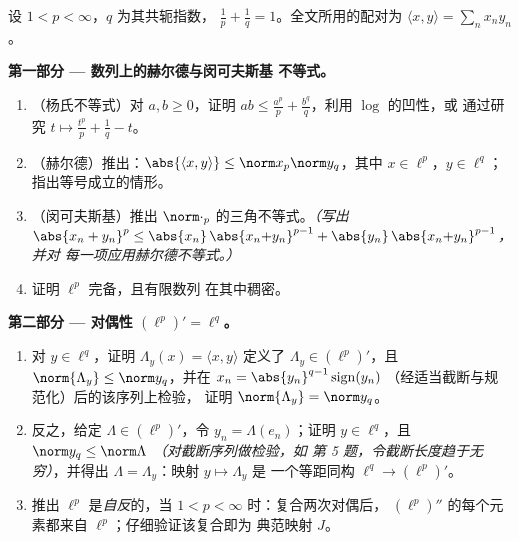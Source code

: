 \begin{problem}[{周末问题 --- $(\ell^p)' = \ell^q$，
自反性，以及 $\ell^\infty$ 的奇异性}]
\label{pb:b3:banach:1}
设 $1 < p < \infty$，$q$ 为其共轭指数，
$\frac1p + \frac1q = 1$。全文所用的配对为 $\langle x,
y\rangle = \sum_n x_ny_n$。

\medskip
\noindent\textbf{第一部分 --- 数列上的赫尔德与闵可夫斯基
不等式。}
\begin{enumerate}
  \item （杨氏不等式）对 $a, b \geq 0$，证明 $ab \leq
        \frac{a^p}p + \frac{b^q}q$，利用 $\log$ 的凹性，或
        通过研究 $t \mapsto \frac{t^p}p + \frac1q - t$。
  \item （赫尔德）推出：$\abs{\langle x, y\rangle} \leq
        \norm x_p\norm y_q$，其中 $x \in \ell^p$，$y \in \ell^q$；
        指出等号成立的情形。
  \item （闵可夫斯基）推出
        $\norm\cdot_p$ 的三角不等式。\emph{（写出 $\abs{x_n + y_n}^p \leq
        \abs{x_n}\,\abs{x_n{+}y_n}^{p-1} +
        \abs{y_n}\,\abs{x_n{+}y_n}^{p-1}$，并对
        每一项应用赫尔德不等式。）}
  \item 证明 $\ell^p$ 完备，且有限数列
        在其中稠密。
\end{enumerate}

\medskip
\noindent\textbf{第二部分 --- 对偶性 $(\ell^p)' =
\ell^q$。}
\begin{enumerate}[resume]
  \item 对 $y \in \ell^q$，证明 $\Lambda_y(x) = \langle
        x, y\rangle$ 定义了 $\Lambda_y \in (\ell^p)'$，且
        $\norm{\Lambda_y} \leq \norm y_q$，并在
        $x_n = \abs{y_n}^{q-1}\operatorname{sign}(y_n)$
        （经适当截断与规范化）后的该序列上检验，
        证明 $\norm{\Lambda_y} = \norm y_q$。
  \item 反之，给定 $\Lambda \in (\ell^p)'$，令 $y_n =
        \Lambda(e_n)$；证明 $y \in \ell^q$，且 $\norm y_q \leq
        \norm\Lambda$ \emph{（对截断序列做检验，如
        第 5 题，令截断长度趋于无穷）}，并得出
        $\Lambda = \Lambda_y$：映射 $y \mapsto \Lambda_y$ 是
        一个等距同构 $\ell^q \to (\ell^p)'$。
  \item 推出 $\ell^p$ 是\emph{自反}的，当 $1 < p <
        \infty$ 时：复合两次对偶后，
        $(\ell^p)''$ 的每个元素都来自 $\ell^p$；仔细验证该复合即为
        典范映射 $J$。
\end{enumerate}


\end{problem}
